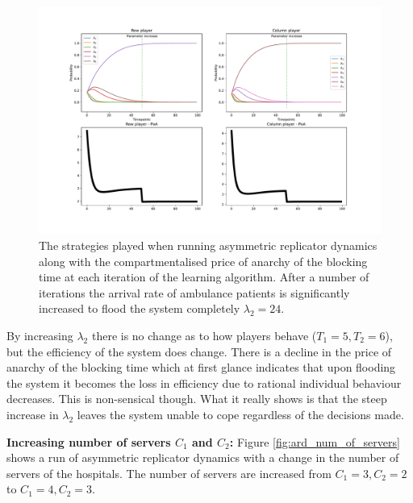 \begin{figure}[H]
    \includegraphics[width=\textwidth]{imgs/asymmetric_rd_and_PoA/asymmetric_flooding.pdf}
    \caption{The strategies played when running asymmetric replicator dynamics
    along with the compartmentalised price of anarchy of the blocking time at
    each iteration of the learning algorithm. After a number of iterations the 
    arrival rate of ambulance patients is significantly increased to flood the
    system completely \( \lambda_2 = 24 \).}
    \label{fig:ard_lambda_2}
\end{figure}


By increasing \(\lambda_2\) there is no change as to how players behave
(\(T_1 = 5, T_2 = 6\)), but the efficiency of the system does change. 
There is a decline in the price of anarchy of the blocking time which at first 
glance indicates that upon flooding the system it becomes the loss in efficiency
due to rational individual behaviour decreases. 
This is non-sensical though.
What it really shows is that the steep increase in \( \lambda_2 \) leaves 
the system unable to cope regardless of the decisions made.

\textbf{Increasing number of servers \( C_1 \) and \( C_2 \):}
Figure \ref{fig:ard_num_of_servers} shows a run of asymmetric replicator 
dynamics with a change in the number of servers of the hospitals.
The number of servers are increased from \(C_1 = 3, C_2 = 2\) to 
\(C_1 = 4, C_2 = 3\).



